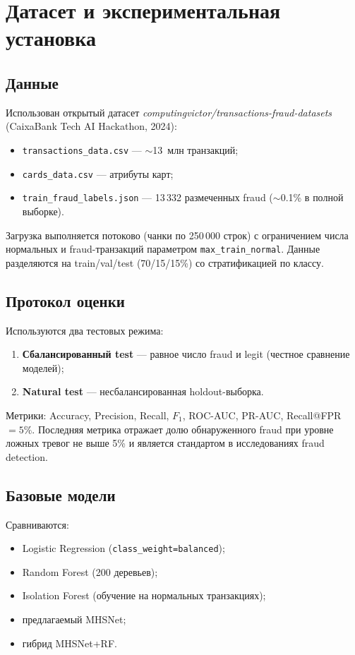 \documentclass[12pt,a4paper]{article}
\begin{document}
\section{Датасет и экспериментальная установка}
\label{sec:setup}

\subsection{Данные}

Использован открытый датасет \textit{computingvictor/transactions-fraud-datasets}~\cite{computingvictor2024}
(CaixaBank Tech AI Hackathon, 2024):
\begin{itemize}
  \item \texttt{transactions\_data.csv} --- $\sim$13~млн транзакций;
  \item \texttt{cards\_data.csv} --- атрибуты карт;
  \item \texttt{train\_fraud\_labels.json} --- 13\,332 размеченных fraud ($\sim$0.1\% в полной выборке).
\end{itemize}

Загрузка выполняется потоково (чанки по 250\,000 строк) с ограничением числа нормальных и fraud-транзакций
параметром \texttt{max\_train\_normal}. Данные разделяются на train/val/test (70/15/15\%)
со стратификацией по классу.

\subsection{Протокол оценки}

Используются два тестовых режима:
\begin{enumerate}
  \item \textbf{Сбалансированный test} --- равное число fraud и legit (честное сравнение моделей);
  \item \textbf{Natural test} --- несбалансированная holdout-выборка.
\end{enumerate}

Метрики: Accuracy, Precision, Recall, $F_1$, ROC-AUC, PR-AUC, Recall@FPR$=5\%$.
Последняя метрика отражает долю обнаруженного fraud при уровне ложных тревог не выше 5\%
и является стандартом в исследованиях fraud detection.

\subsection{Базовые модели}

Сравниваются:
\begin{itemize}
  \item Logistic Regression (\texttt{class\_weight=balanced});
  \item Random Forest (200 деревьев);
  \item Isolation Forest (обучение на нормальных транзакциях);
  \item предлагаемый MHSNet;
  \item гибрид MHSNet+RF.
\end{itemize}
\end{document}
